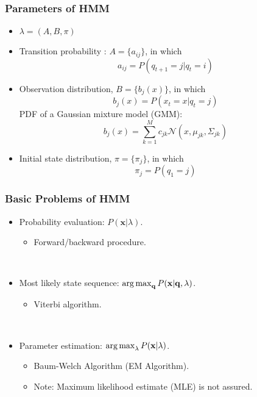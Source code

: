 \documentclass{beamer}
\begin{document}
\begin{frame}
  \frametitle{Parameters of HMM}

  \begin{itemize}
    \item $ \lambda = (A, B, \pi) $
    \item Transition probability : $A = \{a_{ij}\}$, in which 
      \[ a_{ij} = P(q_{t+1} = j | q_t = i) \]
    \item Observation distribution, $B = \{b_j(x)\}$, in which
      \[ b_j(x) = P(x_t = x | q_t = j) \]
      PDF of a Gaussian mixture model (GMM):
      \[ b_j(x) = \sum_{k=1}^M c_{jk} \mathcal{N}(x, \mu_{jk}, \Sigma_{jk}) \]
    \item Initial state distribution, $\pi = \{\pi_j\}$, in which
      \[ \pi_j = P(q_1 = j) \]
  \end{itemize}
\end{frame}

\begin{frame}
  \frametitle{Basic Problems of HMM}

  \begin{itemize}
    \item Probability evaluation: $ P(\mathbf{x}|\lambda) $.
      \begin{itemize}
        \item Forward/backward procedure. 
      \end{itemize}

      ~
    \item Most likely state sequence: $ \operatorname*{arg\,max}_{\mathbf{q}} P(\mathbf{x}|\mathbf{q},\lambda) $.
      \begin{itemize}
        \item Viterbi algorithm.
      \end{itemize}

      ~
    \item Parameter estimation: $ \operatorname*{arg\,max}_{\lambda} P(\mathbf{x}|\lambda) $.
      \begin{itemize}
        \item Baum-Welch Algorithm (EM Algorithm).
        \item Note: Maximum likelihood estimate (MLE) is not assured.
      \end{itemize}
  \end{itemize}
\end{frame}
\end{document}
